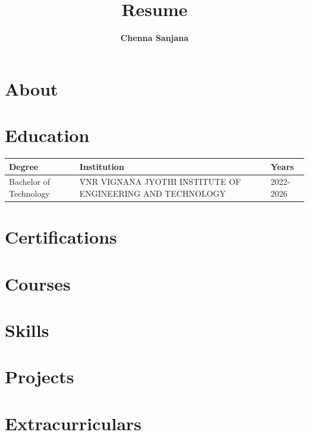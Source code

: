 \documentclass[a4paper, 12pt]{article}
\begin{document}
\title{\textbf{Resume}}
\author{\textbf{Chenna Sanjana}}
\date{}
\maketitle



\section*{About}


\section*{Education}
\renewcommand{\arraystretch}{1.3} %
\begin{longtable}{|p{4cm}|p{7cm}|p{3cm}|} %
    \hline
    \textbf{Degree} & \textbf{Institution} & \textbf{Years} \\ 
    \hline
    Bachelor of Technology & VNR VIGNANA JYOTHI INSTITUTE OF ENGINEERING AND TECHNOLOGY & 2022-2026 \\ \hline
\end{longtable}

\section*{Certifications}
\begin{itemize}
    
\end{itemize}

\section*{Courses}
\begin{itemize}
    
\end{itemize}

\section*{Skills}
\begin{itemize}
    

    

    

    
\end{itemize}

\section*{Projects}
\begin{itemize}
    
\end{itemize}


\section*{Extracurriculars}
\begin{itemize}
    
\end{itemize}
\end{document}
